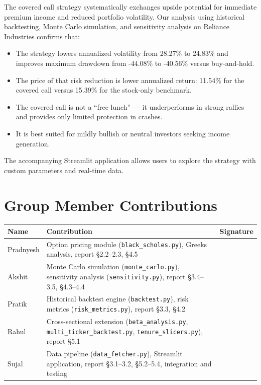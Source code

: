 \documentclass[12pt, a4paper]{article}
\begin{document}
The covered call strategy systematically exchanges upside potential for immediate premium income and reduced portfolio volatility. Our analysis using historical backtesting, Monte Carlo simulation, and sensitivity analysis on Reliance Industries confirms that:
\begin{itemize}
    \item The strategy lowers annualized volatility from 28.27\% to 24.83\% and improves maximum drawdown from -44.08\% to -40.56\% versus buy-and-hold.
    \item The price of that risk reduction is lower annualized return: 11.54\% for the covered call versus 15.39\% for the stock-only benchmark.
    \item The covered call is not a ``free lunch'' — it underperforms in strong rallies and provides only limited protection in crashes.
    \item It is best suited for mildly bullish or neutral investors seeking income generation.
\end{itemize}

The accompanying Streamlit application allows users to explore the strategy with custom parameters and real-time data.


\section*{Group Member Contributions}

\begin{center}
\small
\begin{tabular}{p{3cm} p{7cm} p{3cm}}
    \toprule
    \textbf{Name} & \textbf{Contribution} & \textbf{Signature} \\
    \midrule
    Pradnyesh &
        Option pricing module (\texttt{black\_scholes.py}), Greeks analysis, report §2.2--2.3, §4.5
        & \\[2em]
    Akshit &
        Monte Carlo simulation (\texttt{monte\_carlo.py}), sensitivity analysis (\texttt{sensitivity.py}), report §3.4--3.5, §4.3--4.4
        & \\[2em]
    Pratik &
        Historical backtest engine (\texttt{backtest.py}), risk metrics (\texttt{risk\_metrics.py}), report §3.3, §4.2
        & \\[2em]
    Rahul &
        Cross-sectional extension (\texttt{beta\_analysis.py}, \texttt{multi\_ticker\_backtest.py}, \texttt{tenure\_slicers.py}), report §5.1
        & \\[2em]
    Sujal &
        Data pipeline (\texttt{data\_fetcher.py}), Streamlit application, report §3.1--3.2, §5.2--5.4, integration and testing
        & \\[2em]
    \bottomrule
\end{tabular}
\end{center}
\end{document}
